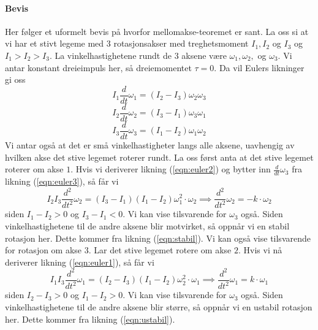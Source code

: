 \paragraph{Bevis}
Her følger et uformelt bevis på hvorfor mellomakse-teoremet er sant. La oss si at vi har et stivt legeme med 3 rotasjonsakser med treghetsmoment $I_1, I_2$ og $I_3$ og $I_1>I_2>I_3.$ La vinkelhastighetene rundt de $3$ aksene være $\omega_1, \omega_2,$ og $\omega_3.$ Vi antar konstant dreieimpuls her, så dreiemomentet $\tau=0$. Da vil Eulers likninger \cite{EULER:1} gi oss
\begin{equation}
\label{eqn:euler1}
    I_1\frac{d}{dt}\omega_1=(I_2-I_3)\omega_2\omega_3
\end{equation}
\begin{equation}
\label{eqn:euler2}
    I_2\frac{d}{dt}\omega_2=(I_3-I_1)\omega_3\omega_1
\end{equation}
\begin{equation}
\label{eqn:euler3}
    I_3\frac{d}{dt}\omega_3=(I_1-I_2)\omega_1\omega_2
\end{equation}
Vi antar også at det er små vinkelhastigheter langs alle aksene, uavhengig av hvilken akse det stive legemet roterer rundt.\newline\newline
La oss først anta at det stive legemet roterer om akse $1.$
Hvis vi deriverer likning (\ref{eqn:euler2}) og bytter inn $\frac{d}{dt}\omega_3$ fra likning (\ref{eqn:euler3}), så får vi
\begin{equation}
    I_2I_3\frac{d^2}{dt^2}\omega_2=(I_3-I_1)(I_1-I_2)\omega_1^2\cdot\omega_2
    \implies \frac{d^2}{dt^2}\omega_2=-k\cdot\omega_2
\end{equation}
siden $I_1-I_2>0$ og $I_3-I_1<0.$ Vi kan vise tilsvarende for $\omega_3$ også. Siden vinkelhastighetene til de andre aksene blir motvirket, så oppnår vi en stabil rotasjon her. Dette kommer fra likning (\ref{eqn:stabil}). Vi kan også vise tilsvarende for rotasjon om akse $3.$\newline\newline
Lar det stive legemet rotere om akse $2.$ Hvis vi nå deriverer likning (\ref{eqn:euler1}), så får vi
\begin{equation}
    I_1I_3\frac{d^2}{dt^2}\omega_1=(I_2-I_3)(I_1-I_2)\omega_2^2\cdot\omega_1
    \implies \frac{d^2}{dt^2}\omega_1=k\cdot\omega_1
\end{equation}
siden $I_2-I_3>0$ og $I_1-I_2>0.$ Vi kan vise tilsvarende for $\omega_3$ også. Siden vinkelhastighetene til de andre aksene blir større, så oppnår vi en ustabil rotasjon her. Dette kommer fra likning (\ref{eqn:ustabil}).